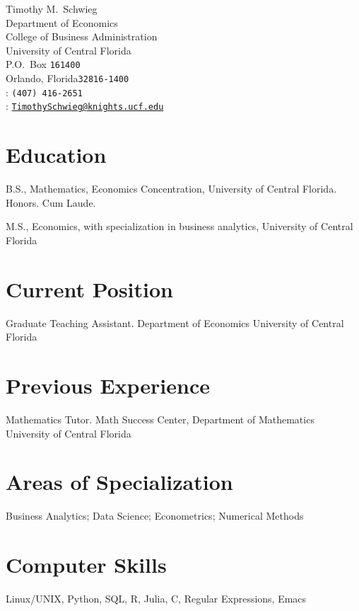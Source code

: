 \documentclass[12pt]{article}
\newcommand{\years}[1]{\marginnote{\scriptsize #1}}
\begin{document}
{\LARGE Timothy M.~Schwieg}\\[1.2cm] 
Department of Economics\\ 
College of Business Administration\\
University of Central Florida\\
P.O.~Box \texttt{161400}\\
Orlando, Florida\quad\texttt{32816-1400}\\[0.4cm]
\phone: \texttt{(407) 416-2651}\\[0.4cm]
\Letter: \href{mailto:TimothySchwieg@knights.ucf.edu}{\tt TimothySchwieg@knights.ucf.edu}\\[0.4cm]
 
\section*{Education}

\years{2017}    B.S., Mathematics, Economics Concentration, University
of Central Florida. Honors. Cum Laude.

\years{Expected}M.S., Economics, with specialization in business analytics,
                University of Central Florida

\section*{Current Position}

Graduate Teaching Assistant. Department of Economics \newline University of Central 
Florida

\section*{Previous Experience}

Mathematics Tutor. Math Success Center,  Department of Mathematics \newline
University of Central Florida

\section*{Areas of Specialization}

Business Analytics; Data Science; Econometrics; Numerical Methods

\section*{Computer Skills}

Linux/UNIX, Python, SQL, R, Julia, C, Regular Expressions, Emacs
\end{document}
